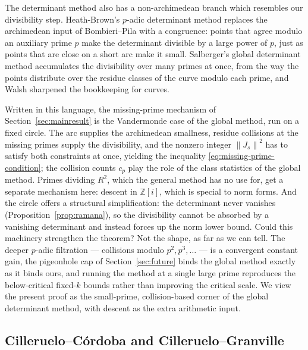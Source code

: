 \documentclass[11pt]{article}
\newcommand{\GI}{\mathbb Z[i]}
\newcommand{\Norm}[1]{\left\lVert#1\right\rVert^2}
\begin{document}
The determinant method also has a non-archimedean branch which resembles our divisibility step.
Heath-Brown's \(p\)-adic determinant method \cite{HeathBrown2002} replaces the archimedean input of Bombieri--Pila with a congruence: points that agree modulo an auxiliary prime \(p\) make the determinant divisible by a large power of \(p\), just as points that are close on a short arc make it small.
Salberger's global determinant method \cite{Salberger2023} accumulates the divisibility over many primes at once, from the way the points distribute over the residue classes of the curve modulo each prime, and Walsh \cite{Walsh2015} sharpened the bookkeeping for curves.

Written in this language, the missing-prime mechanism of Section~\ref{sec:mainresult} is the Vandermonde case of the global method, run on a fixed circle.
The arc supplies the archimedean smallness, residue collisions at the missing primes supply the divisibility, and the nonzero integer \(\Norm{J_s}\) has to satisfy both constraints at once, yielding the inequality \eqref{eq:missing-prime-condition}; the collision counts \(c_p\) play the role of the class statistics of the global method.
Primes dividing \(R^2\), which the general method has no use for, get a separate mechanism here: descent in \(\GI\), which is special to norm forms.
And the circle offers a structural simplification: the determinant never vanishes (Proposition~\ref{prop:ramana}), so the divisibility cannot be absorbed by a vanishing determinant and instead forces up the norm lower bound.
Could this machinery strengthen the theorem?
Not the shape, as far as we can tell.
The deeper \(p\)-adic filtration --- collisions modulo \(p^2,p^3,\ldots\) --- is a convergent constant gain, the pigeonhole cap of Section~\ref{sec:future} binds the global method exactly as it binds ours, and running the method at a single large prime reproduces the below-critical fixed-\(k\) bounds rather than improving the critical scale.
We view the present proof as the small-prime, collision-based corner of the global determinant method, with descent as the extra arithmetic input.

\subsection{Cilleruelo--C\'ordoba and Cilleruelo--Granville}
\label{subsec:cc-log}
\end{document}
